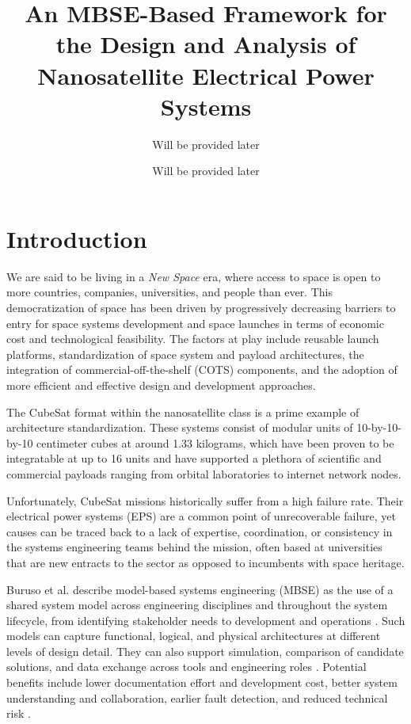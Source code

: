 \documentclass[11pt,a4paper]{article}
\title{An MBSE-Based Framework for the Design and Analysis of Nanosatellite Electrical Power Systems}
\author{Will be provided later}
\date{Will be provided later}
\begin{document}
\maketitle

\section{Introduction}

We are said to be living in a \textit{New Space} era, where access to space is open to more countries, companies, universities, and people than ever.
This democratization of space has been driven by progressively decreasing barriers to entry for space systems development and space launches in terms of economic cost and technological feasibility.
The factors at play include reusable launch platforms, standardization of space system and payload architectures, the integration of commercial-off-the-shelf (COTS) components, and the adoption of more efficient and effective design and development approaches.

The CubeSat format within the nanosatellite class is a prime example of architecture standardization.
These systems consist of modular units of 10-by-10-by-10 centimeter cubes at around 1.33 kilograms, which have been proven to be integratable at up to 16 units \cite{kulu_nanosats_database} and have supported a plethora of scientific and commercial payloads ranging from orbital laboratories to internet network nodes.

Unfortunately, CubeSat missions historically suffer from a high failure rate.
Their electrical power systems (EPS) are a common point of unrecoverable failure, yet causes can be traced back to a lack of expertise, coordination, or consistency in the systems engineering teams behind the mission, often based at universities that are new entracts to the sector as opposed to incumbents with space heritage.

Buruso et al. describe model-based systems engineering (MBSE) as the use of a shared system model across engineering disciplines and throughout the system lifecycle, from identifying stakeholder needs to development and operations \cite{buruso2026modelbased}.
Such models can capture functional, logical, and physical architectures at different levels of design detail.
They can also support simulation, comparison of candidate solutions, and data exchange across tools and engineering roles \cite{buruso2026modelbased}.
Potential benefits include lower documentation effort and development cost, better system understanding and collaboration, earlier fault detection, and reduced technical risk \cite{buruso2026modelbased}.
\end{document}
